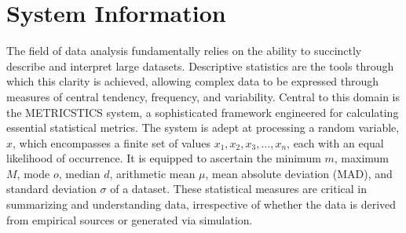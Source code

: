 \documentclass[english,12pt,a4paper]{report}
\begin{document}
	\section{System Information}
	The field of data analysis fundamentally relies on the ability to succinctly describe and interpret large datasets. Descriptive statistics are the tools through which this clarity is achieved, allowing complex data to be expressed through measures of central tendency, frequency, and variability. Central to this domain is the METRICSTICS system, a sophisticated framework engineered for calculating essential statistical metrics. The system is adept at processing a random variable, \( x \), which encompasses a finite set of values \( x_1, x_2, x_3, \ldots, x_n \), each with an equal likelihood of occurrence. It is equipped to ascertain the minimum \( m \), maximum \( M \), mode \( o \), median \( d \), arithmetic mean \( \mu \), mean absolute deviation (MAD), and standard deviation \( \sigma \) of a dataset. These statistical measures are critical in summarizing and understanding data, irrespective of whether the data is derived from empirical sources or generated via simulation.
	
	
\end{document}

